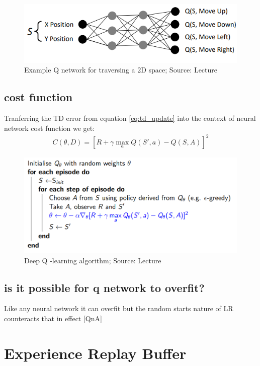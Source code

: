 \begin{figure}[h!]
  \centering
  \includegraphics[scale=0.5]{figures/q_network.PNG}
  \caption{Example Q network for traversing a 2D space; Source: Lecture}
  \label{fig:q_network  }
\end{figure}

\subsection{cost function}
Tranferring the TD error from equation \ref{eq:td_update} into the context of neural network cost function we get:
\begin{align}
    C(\theta, D) = [R + \gamma \max_a Q(S', a) - Q(S, A)]^2
\end{align}
\begin{figure}[h!]
  \centering
  \includegraphics[scale=0.5]{figures/dqn_first.PNG}
  \caption{Deep Q -learning algorithm; Source: Lecture}
  \label{fig:dqn_first}
\end{figure}
\subsection{is it possible for q network to overfit?}
Like any neural network it can overfit but the random starts nature of LR counteracts that in effect [QnA]
\section{Experience Replay Buffer}


